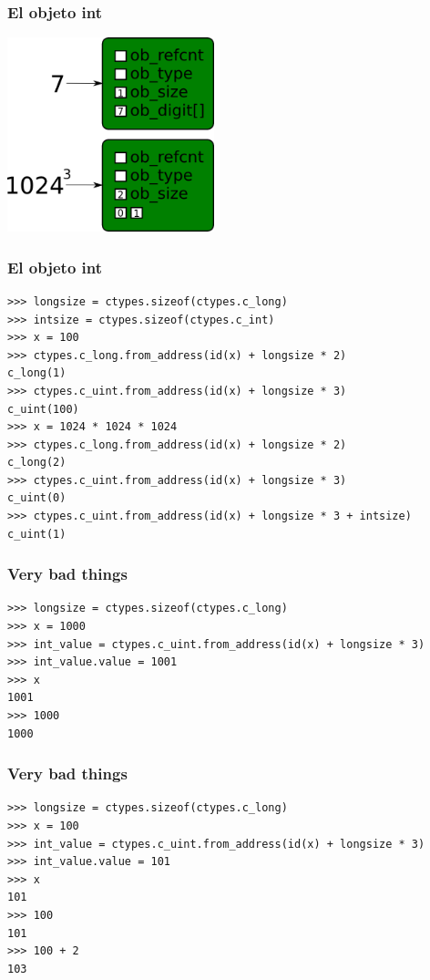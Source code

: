 \documentclass[10pt]{beamer}
\begin{document}
  \begin{frame}[containsverbatim]
    \frametitle{El objeto int}
    \begin{center}\includegraphics[width=6cm]{img/Int-Usage.png}\end{center}
  \end{frame}

  \begin{frame}[containsverbatim]
    \frametitle{El objeto int}
    \begin{verbatim}
>>> longsize = ctypes.sizeof(ctypes.c_long)
>>> intsize = ctypes.sizeof(ctypes.c_int)
>>> x = 100
>>> ctypes.c_long.from_address(id(x) + longsize * 2)
c_long(1)
>>> ctypes.c_uint.from_address(id(x) + longsize * 3)
c_uint(100)
>>> x = 1024 * 1024 * 1024
>>> ctypes.c_long.from_address(id(x) + longsize * 2)
c_long(2)
>>> ctypes.c_uint.from_address(id(x) + longsize * 3)
c_uint(0)
>>> ctypes.c_uint.from_address(id(x) + longsize * 3 + intsize)
c_uint(1)
    \end{verbatim}
  \end{frame}

  \begin{frame}[containsverbatim]
    \frametitle{Very bad things}
    \begin{verbatim}
>>> longsize = ctypes.sizeof(ctypes.c_long)
>>> x = 1000
>>> int_value = ctypes.c_uint.from_address(id(x) + longsize * 3)
>>> int_value.value = 1001
>>> x
1001
>>> 1000
1000
    \end{verbatim}
  \end{frame}

  \begin{frame}[containsverbatim]
    \frametitle{Very bad things}
    \begin{verbatim}
>>> longsize = ctypes.sizeof(ctypes.c_long)
>>> x = 100
>>> int_value = ctypes.c_uint.from_address(id(x) + longsize * 3)
>>> int_value.value = 101
>>> x
101
>>> 100
101
>>> 100 + 2
103
    \end{verbatim}
  \end{frame}
\end{document}
